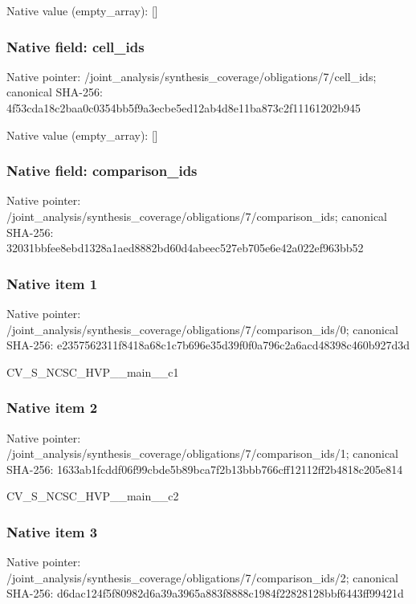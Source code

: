 \documentclass[10pt,a4paper]{article}
\begin{document}
Native value (empty\_\allowbreak{}array): []

\subsubsection{Native field: cell\_\allowbreak{}ids}
Native pointer: /joint\_\allowbreak{}analysis/synthesis\_\allowbreak{}coverage/obligations/7/cell\_\allowbreak{}ids; canonical SHA-256: 4f53cda18c2baa0c0354bb5f9a3ecbe5ed12ab4d8e11ba873c2f11161202b945

Native value (empty\_\allowbreak{}array): []

\subsubsection{Native field: comparison\_\allowbreak{}ids}
Native pointer: /joint\_\allowbreak{}analysis/synthesis\_\allowbreak{}coverage/obligations/7/comparison\_\allowbreak{}ids; canonical SHA-256: 32031bbfee8ebd1328a1aed8882bd60d4abeec527eb705e6e42a022ef963bb52

\subsubsection{Native item 1}
Native pointer: /joint\_\allowbreak{}analysis/synthesis\_\allowbreak{}coverage/obligations/7/comparison\_\allowbreak{}ids/0; canonical SHA-256: e2357562311f8418a68c1c7b696e35d39f0f0a796c2a6acd48398c460b927d3d

\begingroup\raggedright\sloppy CV\_\allowbreak{}S\_\allowbreak{}NCSC\_\allowbreak{}HVP\_\allowbreak{}\_\allowbreak{}main\_\allowbreak{}\_\allowbreak{}c1\par\endgroup

\subsubsection{Native item 2}
Native pointer: /joint\_\allowbreak{}analysis/synthesis\_\allowbreak{}coverage/obligations/7/comparison\_\allowbreak{}ids/1; canonical SHA-256: 1633ab1fcddf06f99cbde5b89bca7f2b13bbb766cff12112ff2b4818c205e814

\begingroup\raggedright\sloppy CV\_\allowbreak{}S\_\allowbreak{}NCSC\_\allowbreak{}HVP\_\allowbreak{}\_\allowbreak{}main\_\allowbreak{}\_\allowbreak{}c2\par\endgroup

\subsubsection{Native item 3}
Native pointer: /joint\_\allowbreak{}analysis/synthesis\_\allowbreak{}coverage/obligations/7/comparison\_\allowbreak{}ids/2; canonical SHA-256: d6dac124f5f80982d6a39a3965a883f8888c1984f22828128bbf6443ff99421d
\end{document}
